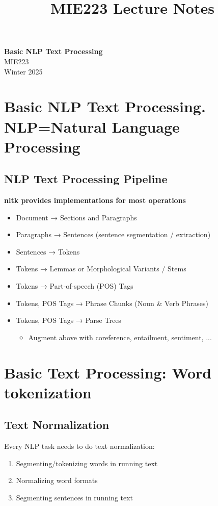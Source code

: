 \documentclass[11pt]{article}
\theoremstyle{definition}
\begin{document}
\setcounter{section}{0}
\title{MIE223 Lecture Notes}

\thispagestyle{empty}

\begin{center}
{\LARGE \bf Basic NLP Text Processing}\\
{\large MIE223}\\
Winter 2025
\end{center}
\section{Basic NLP Text Processing.
 NLP=Natural Language Processing}
\subsection{NLP Text Processing Pipeline}

\textbf{nltk provides
implementations
for most operations}

\begin{itemize}
  \item Document → Sections and Paragraphs
  \item Paragraphs → Sentences (sentence segmentation / extraction)
  \item Sentences → Tokens
  \item Tokens → Lemmas or Morphological Variants / Stems
  \item Tokens → Part-of-speech (POS) Tags
  \item Tokens, POS Tags → Phrase Chunks (Noun \& Verb Phrases)
  \item Tokens, POS Tags → Parse Trees
  \begin{itemize}
    \item Augment above with coreference, entailment, sentiment, ...
  \end{itemize}
\end{itemize}

\section{Basic Text
Processing: Word tokenization}
\subsection{Text Normalization}
Every NLP task needs to do text
normalization:
\begin{enumerate}
  \item Segmenting/tokenizing words in running text
  \item Normalizing word formats
  \item Segmenting sentences in running text
\end{enumerate}
\end{document}
